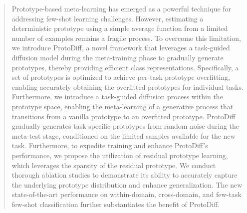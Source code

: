 
\begin{abstract}
%
Prototype-based meta-learning has emerged as a powerful technique for addressing few-shot learning challenges. However, estimating a deterministic prototype using a simple average function from a limited number of examples remains a fragile process. To overcome this limitation, we introduce ProtoDiff, a novel framework that leverages a task-guided diffusion model during the meta-training phase to gradually generate prototypes, thereby providing efficient class representations. Specifically, a set of prototypes is optimized to achieve per-task prototype overfitting, enabling accurately obtaining the overfitted prototypes for individual tasks.
Furthermore, we introduce a task-guided diffusion process within the prototype space, enabling the meta-learning of a generative process that transitions from a vanilla prototype to an overfitted prototype. ProtoDiff gradually generates task-specific prototypes from random noise during the meta-test stage, conditioned on the limited samples available for the new task. Furthermore, to expedite training and enhance ProtoDiff's performance, we propose the utilization of residual prototype learning, which leverages the sparsity of the residual prototype. We conduct thorough ablation studies to demonstrate its ability to accurately capture the underlying prototype distribution and enhance generalization. The new state-of-the-art performance on within-domain, cross-domain, and few-task few-shot classification further substantiates the benefit of ProtoDiff.


\end{abstract}
